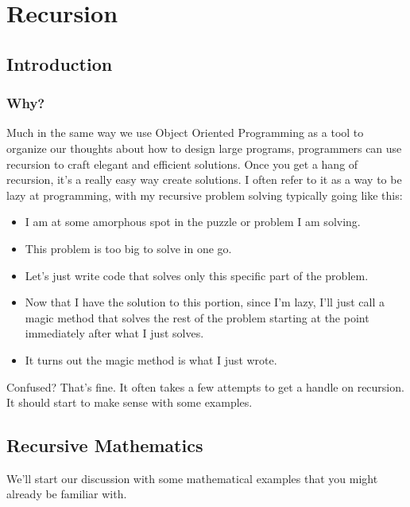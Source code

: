 \chapter{Recursion}

\section{Introduction}


\subsection{Why?}

Much in the same way we use Object Oriented Programming as a tool to organize our thoughts about how to design large programs, programmers can use recursion to craft elegant and efficient solutions. Once you get a hang of recursion, it's a really easy way create solutions.  I often refer to it as a way to be lazy at programming, with my recursive problem solving typically going like this:

\begin{itemize}
	\item I am at some amorphous spot in the puzzle or problem I am solving. 
	\item This problem is too big to solve in one go.
	\item Let's just write code that solves only this specific part of the problem.
	\item Now that I have the solution to this portion, since I'm lazy, I'll just call a magic method that solves the rest of the problem starting at the point immediately  after what  I just solves.
	\item It turns out the magic method is what I just wrote.
\end{itemize}


Confused?  That's fine.  It often takes a few attempts to get a handle on recursion.  It should start to make sense with some examples.
\section{Recursive Mathematics}

We'll start our discussion with some mathematical examples that you might already be familiar with.

